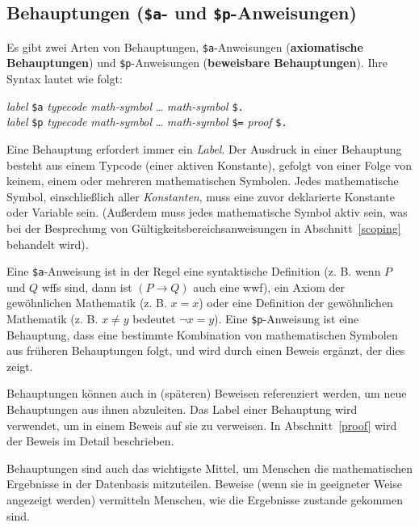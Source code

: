 \subsection{Behauptungen (\texttt{\$a}- und \texttt{\$p}-Anweisungen)}

Es gibt zwei Arten von Behauptungen, \texttt{\$a}-Anweisungen ({\bf axiomatische Behauptungen}) und \texttt{\$p}-Anweisungen ({\bf beweisbare Behauptungen}).  Ihre Syntax lautet wie folgt:
\begin{center}
  {\em label} \texttt{\$a} {\em typecode} {\em math-symbol} \ldots
         {\em math-symbol} \texttt{\$.}\\
  {\em label} \texttt{\$p} {\em typecode} {\em math-symbol} \ldots
        {\em math-symbol} \texttt{\$=} {\em proof} \texttt{\$.}
\end{center}
Eine Behauptung erfordert immer ein {\em Label}. Der Ausdruck in einer Behauptung besteht aus einem Typcode (einer aktiven Konstante), gefolgt von einer Folge von keinem, einem oder mehreren mathematischen Symbolen.  Jedes mathematische Symbol, einschließlich aller {\em Konstanten}, muss eine zuvor deklarierte Konstante oder Variable sein.  (Außerdem muss jedes mathematische Symbol aktiv sein, was bei der Besprechung von Gültigkeitsbereichsanweisungen in Abschnitt~\ref{scoping} behandelt wird).

Eine \texttt{\$a}-Anweisung ist in der Regel eine syntaktische Definition (z. B. wenn $P$ und $Q$ wffs sind, dann ist $(P\to Q)$ auch eine wwf), ein Axiom der gewöhnlichen Mathematik (z. B. $x=x$) oder eine Definition der gewöhnlichen Mathematik (z. B. $x\ne y$ bedeutet $\lnot x=y$). Eine \texttt{\$p}-Anweisung ist eine Behauptung, dass eine bestimmte Kombination von mathematischen Symbolen aus früheren Behauptungen folgt, und wird durch einen Beweis ergänzt, der dies zeigt.

Behauptungen können auch in (späteren) Beweisen referenziert werden, um neue Behauptungen aus ihnen abzuleiten. Das Label einer Behauptung wird verwendet, um in einem Beweis auf sie zu verweisen. In Abschnitt~\ref{proof} wird der Beweis im Detail beschrieben.

Behauptungen sind auch das wichtigste Mittel, um Menschen die mathematischen Ergebnisse in der Datenbasis mitzuteilen.  Beweise (wenn sie in geeigneter Weise angezeigt werden) vermitteln Menschen, wie die Ergebnisse zustande gekommen sind.

